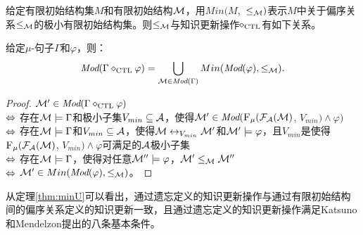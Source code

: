 给定有限初始结构集$M$和有限初始结构${\cal M}$，用$Min(M,$ $\leq_{{\cal M}})$表示$M$中关于偏序关系$\leq_{{\cal M}}$的极小有限初始结构集。则$\leq_{{\cal M}}$与知识更新操作$\diamond_{\textrm{CTL}}$有如下关系。

\begin{theorem}\label{thm:minU}
	给定$\mu$-句子$\Gamma$和$\varphi$，则：
	\[\textit{Mod}(\Gamma \diamond_{\textrm{CTL}} \varphi) = \bigcup_{{\cal M}\in \textit{Mod}(\Gamma)} Min(\textit{Mod}(\varphi), \leq_{{\cal M}}).
	\]
\end{theorem}
\begin{proof}
	${\cal M}'\in \textit{Mod}(\Gamma \diamond_{\textrm{CTL}} \varphi)$\\
	$\Leftrightarrow$ 存在${\cal M} \models \Gamma$和极小子集$V_{min} \subseteq {\cal A}$，使得${\cal M}' \in \textit{Mod}({\textsc{F}_{\textsc{$\mu$}}}({\cal F}_{{\cal A}}({\cal M})$, $V_{min}) \wedge \varphi)$\\
	$\Leftrightarrow$ 存在${\cal M} \models \Gamma$和$V_{min}\subseteq {\cal A}$，使得${\cal M} \leftrightarrow_{V_{min}} {\cal M}'$和${\cal M}' \models \varphi$，且$V_{min}$是使得${\textsc{F}_{\textsc{$\mu$}}}({\cal F}_{{\cal A}}({\cal M})$, $V_{min}) \wedge \varphi$可满足的${\cal A}$极小子集\\
	$\Leftrightarrow$ 存在${\cal M} \models \Gamma$，使得对任意${\cal M}''\models \varphi$，${\cal M}' \leq_{{\cal M}} {\cal M}''$\\
	$\Leftrightarrow$ ${\cal M}' \in Min(\textit{Mod}(\varphi), \leq_{{\cal M}})$。
\end{proof}


从定理\ref{thm:minU}可以看出，通过遗忘定义的知识更新操作与通过有限初始结构间的偏序关系定义的知识更新一致，且通过遗忘定义的知识更新操作满足Katsuno和Mendelzon提出的八条基本条件。


